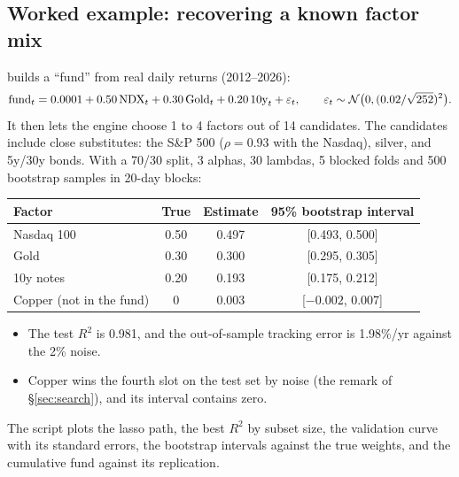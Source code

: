 \documentclass[11pt,a4paper]{article}
\begin{document}
\subsection{Worked example: recovering a known factor mix}
 builds a ``fund'' from real daily returns
(2012--2026):
\[
  \text{fund}_t=0.0001+0.50\,\text{NDX}_t+0.30\,\text{Gold}_t+0.20\,\text{10y}_t+\varepsilon_t,
  \qquad\varepsilon_t\sim\mathcal{N}\big(0,(0.02/\sqrt{252})^2\big).
\]
It then lets the engine choose 1 to 4 factors out of 14 candidates. The candidates include
close substitutes: the S\&P 500 ($\rho=0.93$ with the Nasdaq), silver, and 5y/30y bonds.
With a 70/30 split, 3 alphas, 30 lambdas, 5 blocked folds and 500 bootstrap samples in
20-day blocks:
\begin{center}\small
\begin{tabular}{@{}lccc@{}}
\toprule
Factor & True & Estimate & 95\% bootstrap interval \\
\midrule
Nasdaq 100 & 0.50 & 0.497 & [0.493, 0.500] \\
Gold & 0.30 & 0.300 & [0.295, 0.305] \\
10y notes & 0.20 & 0.193 & [0.175, 0.212] \\
Copper (not in the fund) & 0 & 0.003 & [$-0.002$, 0.007] \\
\bottomrule
\end{tabular}
\end{center}
\begin{itemize}
  \item The test $R^2$ is 0.981, and the out-of-sample tracking error is 1.98\%/yr against
        the 2\% noise.
  \item Copper wins the fourth slot on the test set by noise (the remark of
        \S\ref{sec:search}), and its interval contains zero.
\end{itemize}
The script plots the lasso path, the best $R^2$ by subset size, the validation curve with
its standard errors, the bootstrap intervals against the true weights, and the cumulative
fund against its replication.

\end{document}
